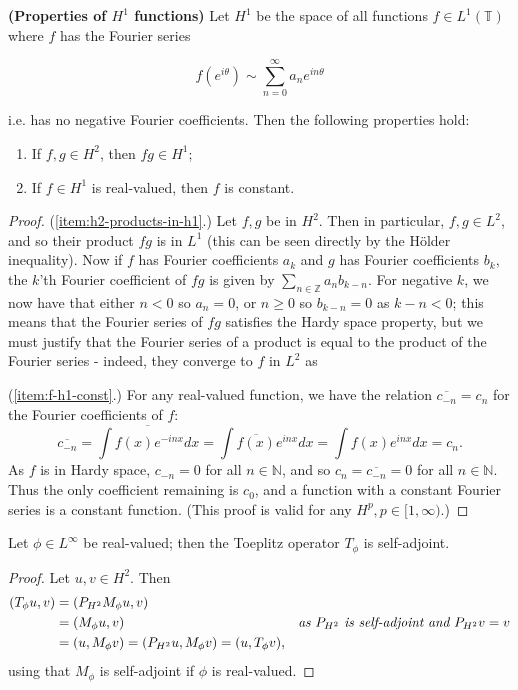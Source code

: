 \documentclass[../main.tex]{subfiles}
\begin{document}
\begin{lemma}{\textbf{(Properties of $H^1$ functions)}}\label{thm:h1-properties}
Let $H^1$ be the space of all functions $f \in L^1(\mathbb{T})$ where $f$ has the Fourier series

$$f(e^{i \theta}) \sim \sum_{n=0}^\infty a_n e^{i n \theta}$$

i.e. has no negative Fourier coefficients. Then the following properties hold:
\begin{enumerate}
\item\label{item:h2-products-in-h1} If $f, g \in H^2$, then $fg \in H^1$;
\item\label{item:f-h1-const} If $f \in H^1$ is real-valued, then $f$ is constant.
\end{enumerate}
\end{lemma}
\begin{proof}
(\ref{item:h2-products-in-h1}.) Let $f, g$ be in $H^2$. Then in particular, $f, g \in L^2$, and so their product $fg$ is in $L^1$ (this can be seen directly by the H\"older inequality). Now if $f$ has Fourier coefficients $a_k$ and $g$ has Fourier coefficients $b_k$, the $k$'th Fourier coefficient of $fg$ is given by $\sum_{n \in \mathbb{Z}} a_n b_{k-n}$. For negative $k$, we now have that either $n < 0$ so $a_n = 0$, or $n \geq 0$ so $b_{k-n} = 0$ as $k-n < 0$;
this means that the Fourier series of $fg$ satisfies the Hardy space property, but we must justify that the Fourier series of a product is equal to the product of the Fourier series - indeed, they converge to $f$ in $L^2$ as 

(\ref{item:f-h1-const}.) For any real-valued function, we have the relation $\overline{c_{-n}} = c_n$ for the Fourier coefficients of $f$:
$$ \overline{c_{-n}} = \overline{\int f(x) e^{-inx} dx} = \int \overline{f(x)} e^{inx} dx = \int f(x) e^{inx} dx = c_n.$$
As $f$ is in Hardy space, $c_{-n} = 0$ for all $n \in \mathbb{N}$, and so $c_n = \overline{c_{-n}} = 0$ for all $n \in \mathbb{N}$. Thus
the only coefficient remaining is $c_0$, and a function with a constant Fourier series is a constant function. (This proof is valid for any $H^p, p \in [1, \infty)$.)
\end{proof}

\begin{lemma}\label{thm:toeplitz-self-adjoint}
Let $\phi \in L^\infty$ be real-valued; then the Toeplitz operator $T_\phi$ is self-adjoint. 
\end{lemma}
\begin{proof}
Let $u, v \in H^2$. Then 
\begin{align*}
(T_\phi u, v) & = ( P_{H^2}M_\phi u, v) & \\
& = (M_\phi u, v) & \text{\emph{as $P_{H^2}$ is self-adjoint and $P_{H^2}v = v$}}\\
& = (u, M_\phi v) = (P_{H^2}u, M_\phi v) = (u, T_\phi v),
\end{align*}
using that $M_\phi$ is self-adjoint if $\phi$ is real-valued.
\end{proof}
\end{document}
